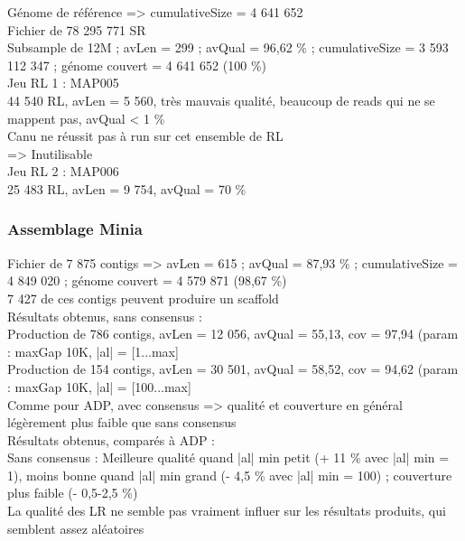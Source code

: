 \documentclass[12pt]{article}
\begin{document}
Génome de référence => cumulativeSize = 4 641 652 \\

Fichier de 78 295 771 SR \\
Subsample de 12M ; avLen = 299 ; avQual = 96,62 \% ; cumulativeSize = 3 593 112 347 ; génome couvert = 4 641 652 (100 \%) \\

Jeu RL 1 : MAP005 \\
44 540 RL, avLen = 5 560, très mauvais qualité, beaucoup de reads qui ne se mappent pas, avQual < 1 \% \\
Canu ne réussit pas à run sur cet ensemble de RL \\
=> Inutilisable \\

Jeu RL 2 : MAP006 \\
25 483 RL, avLen = 9 754, avQual = 70 \%

\subsubsection{Assemblage Minia}

Fichier de 7 875 contigs => avLen = 615 ; avQual = 87,93 \% ; cumulativeSize = 4 849 020 ; génome couvert = 4 579 871 (98,67 \%) \\

7 427 de ces contigs peuvent produire un scaffold \\

Résultats obtenus, sans consensus : \\

Production de 786 contigs, avLen = 12 056, avQual = 55,13, cov = 97,94 (param : maxGap 10K, |al| = [1...max] \\
Production de 154 contigs, avLen = 30 501, avQual = 58,52, cov = 94,62 (param : maxGap 10K, |al| = [100...max] \\

Comme pour ADP, avec consensus => qualité et couverture en général légèrement plus faible que sans consensus \\

Résultats obtenus, comparés à ADP : \\

Sans consensus : Meilleure qualité quand |al| min petit (+ 11 \% avec |al| min = 1), 
moins bonne quand |al| min grand (- 4,5 \% avec |al| min = 100) ; couverture plus faible (- 0,5-2,5 \%) \\

La qualité des LR ne semble pas vraiment influer sur les résultats produits, qui semblent assez aléatoires \\
\end{document}
